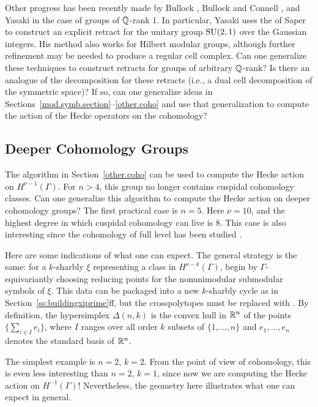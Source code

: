 Other progress has been recently made by Bullock \cite{bullock},
Bullock and Connell \cite{bullock.connell}, and Yasaki \cite{yasaki1,
yasaki2} in the case of groups of $\mathbb{Q}$-rank 1.  In particular, Yasaki
uses the  of Saper \cite{saper} to construct an explicit
retract for the unitary group $\operatorname{SU} (2,1)$ over the Gaussian integers.
His method also works for Hilbert modular groups, although further
refinement may be needed to produce a regular cell complex.  Can one
generalize these techniques to construct retracts for groups of
arbitrary $\mathbb{Q}$-rank?  Is there an analogue of the \Vor decomposition
for these retracts (i.e., a dual cell decomposition of the symmetric
space)?  If so, can one generalize ideas in
Sections~\ref{mod.symb.section}--\ref{other.coho} and use 
that generalization to compute the
action of the Hecke operators on the cohomology?



\subsection{Deeper Cohomology Groups}
%
The algorithm in Section~\ref{other.coho} can be used
to compute the Hecke action on
$H^{\nu -1} (\Gamma)$.  For $n>4$, this group no longer contains
cuspidal cohomology classes.  Can one generalize this algorithm to
compute the Hecke action on deeper cohomology groups?  The first
practical case is $n=5$.  Here $\nu = 10$, and the highest degree in
which cuspidal cohomology can live is $8$.  This case is also
interesting since the cohomology of full level has been studied
\cite{gangl}.

Here are some indications of what one can expect.  The general
strategy is the same: for a $k$-sharbly $\xi$ representing a
class in $H^{\nu -k} (\Gamma)$, begin by $\Gamma$-equivariantly
choosing reducing points for the nonunimodular submodular symbols of
$\xi$.  This data can be packaged into a new $k$-sharbly cycle as in
Section~\ref{ss:buildingxiprime}ff, but the crosspolytopes must be replaced
with .  By definition, the hypersimplex $\Delta
(n,k)$ is the convex hull in $\mathbb{R}^{n}$ of the points $\{\sum_{i\in I}
e_{i} \}$, where $I$ ranges over all order $k$ subsets of $\{1,\dotsc
,n \}$ and $e_{1},\dotsc ,e_{n}$ denotes the standard 
basis of $\mathbb{R} ^{n}$.

The simplest example is $n=2$, $k=2$.  From the point of view of
cohomology, this is even less interesting than $n=2$, $k=1$, since now
we are computing the Hecke action on $H^{-1} (\Gamma)$!  Nevertheless,
the geometry here illustrates what one can expect in general.

